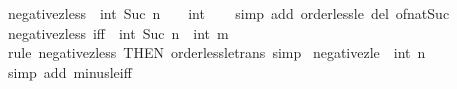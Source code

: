 \begin{isabellebody}
{}
\isamarkuptrue%
%
\endisatagdocument
{\isafolddocument}%
%
\isadelimdocument
%
\endisadelimdocument
{}\isamarkupfalse%
\ negative{\isacharunderscore}{\kern0pt}zless{\isacharunderscore}{\kern0pt}{}{\isacharcolon}{\kern0pt}\ {\isachardoublequoteopen}{\isacharminus}{\kern0pt}\ {\isacharparenleft}{\kern0pt}int\ {\isacharparenleft}{\kern0pt}Suc\ n{\isacharparenright}{\kern0pt}{\isacharparenright}{\kern0pt}\ {\isacharless}{\kern0pt}\ {\isacharparenleft}{\kern0pt}{}\ {\isacharcolon}{\kern0pt}{\isacharcolon}{\kern0pt}\ int{\isacharparenright}{\kern0pt}{\isachardoublequoteclose}\isanewline
%
\isadelimproof
\ \ %
\endisadelimproof
%
\isatagproof
{}\isamarkupfalse%
\ {\isacharparenleft}{\kern0pt}simp\ add{\isacharcolon}{\kern0pt}\ order{\isacharunderscore}{\kern0pt}less{\isacharunderscore}{\kern0pt}le\ del{\isacharcolon}{\kern0pt}\ of{\isacharunderscore}{\kern0pt}nat{\isacharunderscore}{\kern0pt}Suc{\isacharparenright}{\kern0pt}%
\endisatagproof
{\isafoldproof}%
%
\isadelimproof
\isanewline
%
\endisadelimproof
\isanewline
{}\isamarkupfalse%
\ negative{\isacharunderscore}{\kern0pt}zless\ {\isacharbrackleft}{\kern0pt}iff{\isacharbrackright}{\kern0pt}{\isacharcolon}{\kern0pt}\ {\isachardoublequoteopen}{\isacharminus}{\kern0pt}\ {\isacharparenleft}{\kern0pt}int\ {\isacharparenleft}{\kern0pt}Suc\ n{\isacharparenright}{\kern0pt}{\isacharparenright}{\kern0pt}\ {\isacharless}{\kern0pt}\ int\ m{\isachardoublequoteclose}\isanewline
%
\isadelimproof
\ \ %
\endisadelimproof
%
\isatagproof
{}\isamarkupfalse%
\ {\isacharparenleft}{\kern0pt}rule\ negative{\isacharunderscore}{\kern0pt}zless{\isacharunderscore}{\kern0pt}{}\ {\isacharbrackleft}{\kern0pt}THEN\ order{\isacharunderscore}{\kern0pt}less{\isacharunderscore}{\kern0pt}le{\isacharunderscore}{\kern0pt}trans{\isacharbrackright}{\kern0pt}{\isacharcomma}{\kern0pt}\ simp{\isacharparenright}{\kern0pt}%
\endisatagproof
{\isafoldproof}%
%
\isadelimproof
\isanewline
%
\endisadelimproof
\isanewline
{}\isamarkupfalse%
\ negative{\isacharunderscore}{\kern0pt}zle{\isacharunderscore}{\kern0pt}{}{\isacharcolon}{\kern0pt}\ {\isachardoublequoteopen}{\isacharminus}{\kern0pt}\ int\ n\ {\isasymle}\ {}{\isachardoublequoteclose}\isanewline
%
\isadelimproof
\ \ %
\endisadelimproof
%
\isatagproof
{}\isamarkupfalse%
\ {\isacharparenleft}{\kern0pt}simp\ add{\isacharcolon}{\kern0pt}\ minus{\isacharunderscore}{\kern0pt}le{\isacharunderscore}{\kern0pt}iff{\isacharparenright}{\kern0pt}%
\endisatagproof
{\isafoldproof}%

\end{isabellebody}
